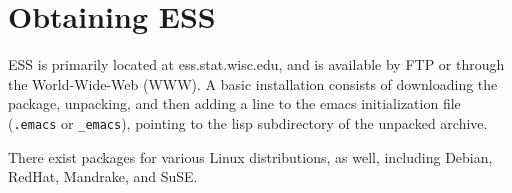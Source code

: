 \documentclass{article}
\begin{document}





\section{Obtaining ESS}
\label{sec:getIt}

ESS is primarily located at ess.stat.wisc.edu, and is available by FTP
or through the World-Wide-Web (WWW).  A basic installation consists of
downloading the package, unpacking, and then adding a line to the
emacs initialization file (\verb+.emacs+ or \verb+_emacs+), pointing
to the lisp subdirectory of the unpacked archive.

There exist packages for various Linux distributions, as well,
including Debian, RedHat, Mandrake, and SuSE.
\end{document}

